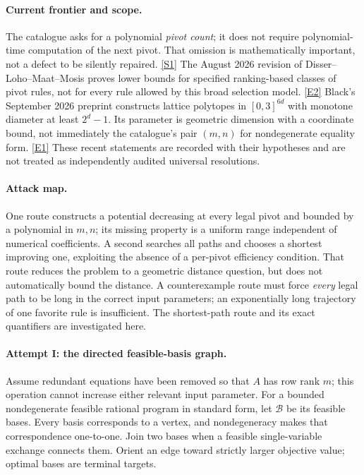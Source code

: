 \documentclass[11pt,a4paper]{article}
\newcommand{\sref}[2]{\hyperlink{source:#1:#2}{[S#2]}}
\newcommand{\eref}[2]{\hyperlink{extra:#1:#2}{[E#2]}}
\numberwithin{equation}{section}
\begin{document}
\paragraph{Current frontier and scope.}
The catalogue asks for a polynomial \emph{pivot count}; it does not
require polynomial-time computation of the next pivot.  That omission
is mathematically important, not a defect to be silently repaired.
\sref{statement}{1}  The August 2026 revision of Disser--Loho--Maat--Mosis
proves lower bounds for specified ranking-based classes of pivot rules,
not for every rule allowed by this broad selection model.
\eref{statement}{2}  Black's September 2026 preprint constructs lattice
polytopes in $[0,3]^{6d}$ with monotone diameter at least $2^d-1$.
Its parameter is geometric dimension with a coordinate bound, not
immediately the catalogue's pair $(m,n)$ for nondegenerate equality
form. \eref{statement}{1}  These recent statements are recorded with their
hypotheses and are not treated as independently audited universal
resolutions.

\paragraph{Attack map.}
One route constructs a potential decreasing at every legal pivot and
bounded by a polynomial in $m,n$; its missing property is a uniform
range independent of numerical coefficients.  A second searches all
paths and chooses a shortest improving one, exploiting the absence
of a per-pivot efficiency condition.  That route reduces the problem
to a geometric distance question, but does not automatically bound the
distance.  A counterexample route must force \emph{every} legal path
to be long in the correct input parameters; an exponentially long
trajectory of one favorite rule is insufficient.  The shortest-path
route and its exact quantifiers are investigated here.

\paragraph{Attempt I: the directed feasible-basis graph.}
Assume redundant equations have been removed so that $A$ has row rank
$m$; this operation cannot increase either relevant input parameter.
For a bounded nondegenerate feasible rational program in standard form,
let $\mathcal B$ be its feasible bases.  Every basis corresponds to a
vertex, and nondegeneracy makes that correspondence one-to-one.  Join
two bases when a feasible single-variable exchange connects them.
Orient an edge toward strictly larger objective value; optimal bases
are terminal targets.
\end{document}
